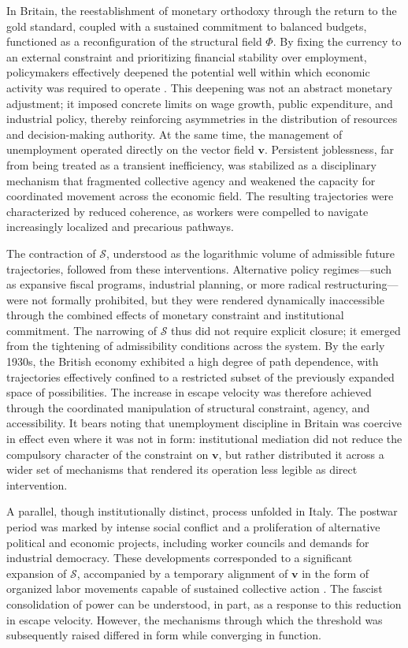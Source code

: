 \documentclass[11pt, a4paper]{article}
\begin{document}
In Britain, the reestablishment of monetary orthodoxy through the return to the gold standard, coupled with a sustained commitment to balanced budgets, functioned as a reconfiguration of the structural field $\Phi$. By fixing the currency to an external constraint and prioritizing financial stability over employment, policymakers effectively deepened the potential well within which economic activity was required to operate \cite{mattei2022}. This deepening was not an abstract monetary adjustment; it imposed concrete limits on wage growth, public expenditure, and industrial policy, thereby reinforcing asymmetries in the distribution of resources and decision-making authority. At the same time, the management of unemployment operated directly on the vector field $\mathbf{v}$. Persistent joblessness, far from being treated as a transient inefficiency, was stabilized as a disciplinary mechanism that fragmented collective agency and weakened the capacity for coordinated movement across the economic field. The resulting trajectories were characterized by reduced coherence, as workers were compelled to navigate increasingly localized and precarious pathways.

The contraction of $\mathcal{S}$, understood as the logarithmic volume of admissible future trajectories, followed from these interventions. Alternative policy regimes---such as expansive fiscal programs, industrial planning, or more radical restructuring---were not formally prohibited, but they were rendered dynamically inaccessible through the combined effects of monetary constraint and institutional commitment. The narrowing of $\mathcal{S}$ thus did not require explicit closure; it emerged from the tightening of admissibility conditions across the system. By the early 1930s, the British economy exhibited a high degree of path dependence, with trajectories effectively confined to a restricted subset of the previously expanded space of possibilities. The increase in escape velocity was therefore achieved through the coordinated manipulation of structural constraint, agency, and accessibility. It bears noting that unemployment discipline in Britain was coercive in effect even where it was not in form: institutional mediation did not reduce the compulsory character of the constraint on $\mathbf{v}$, but rather distributed it across a wider set of mechanisms that rendered its operation less legible as direct intervention.

A parallel, though institutionally distinct, process unfolded in Italy. The postwar period was marked by intense social conflict and a proliferation of alternative political and economic projects, including worker councils and demands for industrial democracy. These developments corresponded to a significant expansion of $\mathcal{S}$, accompanied by a temporary alignment of $\mathbf{v}$ in the form of organized labor movements capable of sustained collective action \cite{mattei2022}. The fascist consolidation of power can be understood, in part, as a response to this reduction in escape velocity. However, the mechanisms through which the threshold was subsequently raised differed in form while converging in function.
\end{document}
